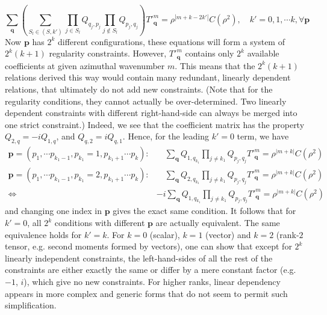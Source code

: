 \documentclass[a4paper, 11pt]{article}
\begin{document}
\begin{equation}\label{eqn:cond-suff}
    \sum_{\mathbf{q}} \left(\sum_{S_l \in (S, k')} \prod_{j\in S_l} Q_{q_j,p_j} \prod_{j\notin S_l} Q_{p_{j},q_{j}}\right) T'^m_\mathbf{q} = \rho^{|m + k - 2k'|} C(\rho^2),\quad k' = 0, 1, \cdots k, \forall \mathbf{p}
\end{equation}
Now $\mathbf{p}$ has $2^k$ different configurations, these equations will form a system of $2^k(k+1)$ regularity constraints. However, $T'^m_\mathbf{q}$ contains only $2^k$ available coefficients at given azimuthal wavenumber $m$. This means that the $2^k(k+1)$ relations derived this way would contain many redundant, linearly dependent relations, that ultimately do not add new constraints. (Note that for the regularity conditions, they cannot actually be over-determined. Two linearly dependent constraints with different right-hand-side can always be merged into one strict constraint.) Indeed, we see that the coefficient matrix has the property $Q_{2,q} = -i Q_{1,q}$, and $Q_{q,2} = iQ_{q,1}$. Hence, for the leading $k'=0$ term, we have
\[\begin{aligned}
    \mathbf{p} = \left(p_1, \cdots p_{k_1-1}, p_{k_1}=1, p_{k_1+1}\cdots p_k\right):& \quad \sum_{\mathbf{q}} Q_{1,q_{k_1}} \prod_{j\neq k_1} Q_{p_j,q_j} T'^m_\mathbf{q} = \rho^{|m+k|} C(\rho^2) \\ 
    \mathbf{p} = \left(p_1, \cdots p_{k_1-1}, p_{k_1}=2, p_{k_1+1}\cdots p_k\right):& \quad \sum_{\mathbf{q}} Q_{2,q_{k_1}} \prod_{j\neq k_1} Q_{p_j,q_j} T'^m_\mathbf{q} = \rho^{|m+k|} C(\rho^2) \\ 
    \Longleftrightarrow \quad & -i \sum_{\mathbf{q}} Q_{1,q_{k_1}} \prod_{j\neq k_1} Q_{p_j,q_j} T'^m_\mathbf{q} = \rho^{|m+k|} C(\rho^2)
\end{aligned}\]
and changing one index in $\mathbf{p}$ gives the exact same condition. It follows that for $k'=0$, all $2^k$ conditions with different $\mathbf{p}$ are actually equivalent. The same equivalence holds for $k'=k$.
For $k=0$ (scalar), $k=1$ (vector) and $k=2$ (rank-$2$ tensor, e.g. second moments formed by vectors), one can show that except for $2^k$ linearly independent constraints, the left-hand-sides of all the rest of the constraints are either exactly the same or differ by a mere constant factor (e.g. $-1$, $i$), which give no new constraints. For higher ranks, linear dependency appears in more complex and generic forms that do not seem to permit such simplification.
\end{document}
